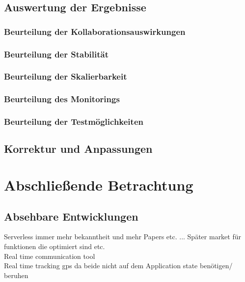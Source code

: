 \documentclass[11pt]{article}
\begin{document}
\subsection{Auswertung der Ergebnisse}
\subsubsection{Beurteilung der Kollaborationsauswirkungen}
\subsubsection{Beurteilung der Stabilität}
\subsubsection{Beurteilung der Skalierbarkeit} 
\subsubsection{Beurteilung des Monitorings}
\subsubsection{Beurteilung der Testmöglichkeiten} 
\subsection{Korrektur und Anpassungen}
\section{Abschließende Betrachtung}
\subsection{Absehbare Entwicklungen}
\cite{al2019systematic} Serverless  immer mehr bekanntheit und mehr Papers etc. ... Später market für funktionen die optimiert sind etc. \cite{shafiei2020serverless}\\
Real time communication tool  \cite{shafiei2020serverless} \\
Real time tracking gps  \cite{shafiei2020serverless} da beide nicht auf dem Application state benötigen/ beruhen  \cite{shafiei2020serverless} \\
\cite{hellerstein2018serverless}
\end{document}
